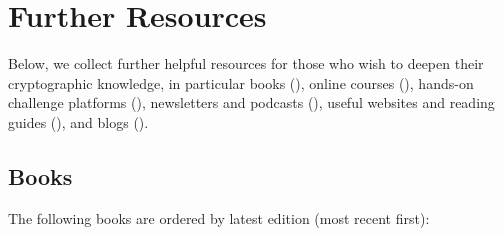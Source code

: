 \section{Further Resources}\label{sec:appendix:further_resources}
\vspace{7.5cm}

Below, we collect further helpful resources for those who wish to deepen their cryptographic knowledge, in particular books (), online courses (), hands-on challenge platforms (), newsletters and podcasts (), useful websites and reading guides (), and blogs ().


\subsection{Books}\label{sec:appendix:further_resources:books}

The following books are ordered by latest edition (most recent first):

